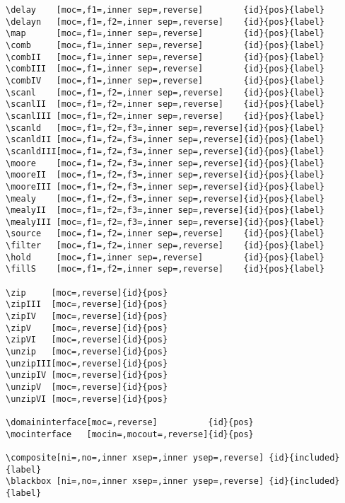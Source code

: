 \begin{lstlisting}
\delay    [moc=,f1=,inner sep=,reverse]        {id}{pos}{label}
\delayn   [moc=,f1=,f2=,inner sep=,reverse]    {id}{pos}{label}
\map      [moc=,f1=,inner sep=,reverse]        {id}{pos}{label}
\comb     [moc=,f1=,inner sep=,reverse]        {id}{pos}{label}
\combII   [moc=,f1=,inner sep=,reverse]        {id}{pos}{label}
\combIII  [moc=,f1=,inner sep=,reverse]        {id}{pos}{label}
\combIV   [moc=,f1=,inner sep=,reverse]        {id}{pos}{label}
\scanl    [moc=,f1=,f2=,inner sep=,reverse]    {id}{pos}{label}
\scanlII  [moc=,f1=,f2=,inner sep=,reverse]    {id}{pos}{label}
\scanlIII [moc=,f1=,f2=,inner sep=,reverse]    {id}{pos}{label}
\scanld   [moc=,f1=,f2=,f3=,inner sep=,reverse]{id}{pos}{label}
\scanldII [moc=,f1=,f2=,f3=,inner sep=,reverse]{id}{pos}{label}
\scanldIII[moc=,f1=,f2=,f3=,inner sep=,reverse]{id}{pos}{label}
\moore    [moc=,f1=,f2=,f3=,inner sep=,reverse]{id}{pos}{label}
\mooreII  [moc=,f1=,f2=,f3=,inner sep=,reverse]{id}{pos}{label}
\mooreIII [moc=,f1=,f2=,f3=,inner sep=,reverse]{id}{pos}{label}
\mealy    [moc=,f1=,f2=,f3=,inner sep=,reverse]{id}{pos}{label}
\mealyII  [moc=,f1=,f2=,f3=,inner sep=,reverse]{id}{pos}{label}
\mealyIII [moc=,f1=,f2=,f3=,inner sep=,reverse]{id}{pos}{label}
\source   [moc=,f1=,f2=,inner sep=,reverse]    {id}{pos}{label}
\filter   [moc=,f1=,f2=,inner sep=,reverse]    {id}{pos}{label}
\hold     [moc=,f1=,inner sep=,reverse]        {id}{pos}{label}
\fillS    [moc=,f1=,f2=,inner sep=,reverse]    {id}{pos}{label}

\zip     [moc=,reverse]{id}{pos}
\zipIII  [moc=,reverse]{id}{pos}
\zipIV   [moc=,reverse]{id}{pos}
\zipV    [moc=,reverse]{id}{pos}
\zipVI   [moc=,reverse]{id}{pos}
\unzip   [moc=,reverse]{id}{pos}
\unzipIII[moc=,reverse]{id}{pos}
\unzipIV [moc=,reverse]{id}{pos}
\unzipV  [moc=,reverse]{id}{pos}
\unzipVI [moc=,reverse]{id}{pos}

\domaininterface[moc=,reverse]          {id}{pos}
\mocinterface   [mocin=,mocout=,reverse]{id}{pos}

\composite[ni=,no=,inner xsep=,inner ysep=,reverse] {id}{included}{label}
\blackbox [ni=,no=,inner xsep=,inner ysep=,reverse] {id}{included}{label}


\end{lstlisting}
